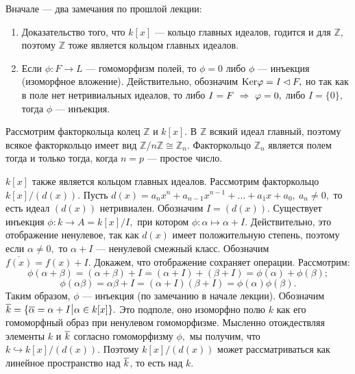 Вначале --- два замечания по прошлой лекции:
\begin{enumerate}
    \item Доказательство того, что $k[x]$ --- кольцо главных идеалов, годится и для $\mathbb Z$, поэтому $\mathbb Z$ тоже является кольцом главных идеалов.
    \item Если $\phi : F\rightarrow L$ --- гомоморфизм полей, то $\phi=0$ либо $\phi$ --- инъекция (изоморфное вложение). Действительно, обозначим ${\rm Ker}\varphi=I\lhd F,$ но
    так как в поле нет нетривиальных идеалов, то либо $I=F\ \Rightarrow\  \varphi=0,$ либо $I=\{0\},$ тогда $\phi$ --- инъекция.
\end{enumerate}

Рассмотрим факторкольца колец $\mathbb Z$ и $k[x].$ В $\mathbb Z$ всякий идеал главный, поэтому всякое факторкольцо имеет вид $\mathbb{Z}/n\mathbb Z\cong \mathbb Z_n.$ Факторкольцо
$\mathbb Z_n$ является полем тогда и только тогда, когда $n=p$ --- простое число.

$k[x]$ также является кольцом главных идеалов. Рассмотрим
факторкольцо $k[x]/(d(x)).$ Пусть
$d(x)=a_nx^n+a_{n-1}x^{n-1}+\dots+a_1x+a_0,\ a_n\ne 0,$ то есть
идеал $(d(x))$ нетривиален. Обозначим $I=(d(x)).$ Существует
инъекция $\phi : k\rightarrow A=k[x]/I,$ при котором $\phi :
\alpha\mapsto \alpha + I.$ Действительно, это отображение
ненулевое, так как $d(x)$ имеет положительную степень, поэтому
если $\alpha\ne 0,$ то $\alpha+ I$ --- ненулевой смежный класс.
Обозначим $\overline{f(x)}=f(x)+I.$ Докажем, что отображение
сохраняет операции. Рассмотрим:
$$\phi(\alpha+\beta)=(\alpha+\beta)+I=(\alpha +
I)+(\beta+I)=\phi(\alpha)+\phi(\beta);$$
$$
\phi(\alpha\beta)=\alpha\beta+I=(\alpha+I)(\beta+I)=\phi(\alpha)\phi(\beta).
$$
Таким образом, $\phi$ --- инъекция (по замечанию в начале лекции).
Обозначим $\ov k=\{\ov\alpha=\alpha+I\,\vrule\,\alpha\in k[x]\}.$
Это подполе, оно изоморфно полю $k$ как его гомоморфный образ при
ненулевом гомоморфизме. Мысленно отождествляя элементы $k$ и $\overline{k}$ согласно гомоморфизму $\phi,$ мы получим, что $k\hookrightarrow
k[x]/(d(x)).$ Поэтому $k[x]/(d(x))$ может рассматриваться как
линейное пространство над $\overline{k}$, то есть над $k$.

